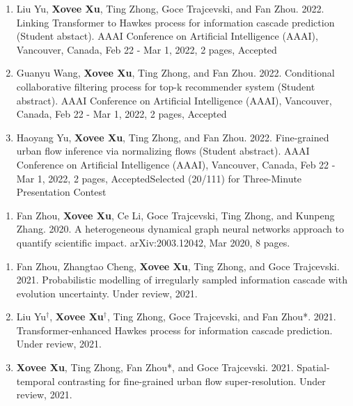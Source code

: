 
\begin{enumerate}[resume]
    \item Liu Yu, \textbf{Xovee Xu}, Ting Zhong, Goce Trajcevski, and Fan Zhou. 2022. Linking Transformer to Hawkes process for information cascade prediction (Student abstact). AAAI Conference on Artificial Intelligence (AAAI), Vancouver, Canada, Feb 22 - Mar 1, 2022, 2 pages, Accepted
    \item Guanyu Wang, \textbf{Xovee Xu}, Ting Zhong, and Fan Zhou. 2022. Conditional collaborative filtering process for top-k recommender system (Student abstract). AAAI Conference on Artificial Intelligence (AAAI), Vancouver, Canada, Feb 22 - Mar 1, 2022, 2 pages, Accepted
    \item Haoyang Yu, \textbf{Xovee Xu}, Ting Zhong, and Fan Zhou. 2022. Fine-grained urban flow inference via normalizing flows (Student abstract). AAAI Conference on Artificial Intelligence (AAAI), Vancouver, Canada, Feb 22 - Mar 1, 2022, 2 pages, Accepted\newline Selected (20/111) for Three-Minute Presentation Contest
\end{enumerate}


\begin{enumerate}[resume]
    \item Fan Zhou, \textbf{Xovee Xu}, Ce Li, Goce Trajcevski, Ting Zhong, and Kunpeng Zhang. 2020. A heterogeneous dynamical graph neural networks approach to quantify scientific impact. arXiv:2003.12042, Mar 2020, 8 pages. 
\end{enumerate}


\begin{enumerate}[resume]
    \item Fan Zhou, Zhangtao Cheng, \textbf{Xovee Xu}, Ting Zhong, and Goce Trajcevski. 2021. Probabilistic modelling of irregularly sampled information cascade with evolution uncertainty. Under review, 2021.
    \item Liu Yu$^\dagger$, \textbf{Xovee Xu}$^\dagger$, Ting Zhong, Goce Trajcevski, and Fan Zhou*. 2021. Transformer-enhanced Hawkes process for information cascade prediction. Under review, 2021.
    \item \textbf{Xovee Xu}, Ting Zhong, Fan Zhou*, and Goce Trajcevski. 2021. Spatial-temporal contrasting for fine-grained urban flow super-resolution. Under review, 2021.
\end{enumerate}

